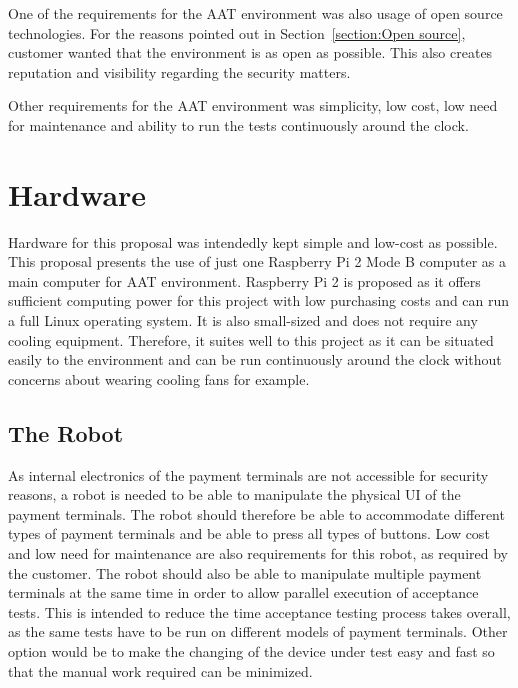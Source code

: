 One of the requirements for the AAT environment was also usage of open source technologies. For the reasons pointed out in Section~\ref{section:Open source}, customer wanted that the environment is as open as possible. This also creates reputation and visibility regarding the security matters.

Other requirements for the AAT environment was simplicity, low cost, low need for maintenance and ability to run the tests continuously around the clock.

\section{Hardware}
\label{section:Proposed hardware}

Hardware for this proposal was intendedly kept simple and low-cost as possible. This proposal presents the use of just one Raspberry Pi 2 Mode B \citep{raspberry} computer as a main computer for AAT environment. Raspberry Pi 2 is proposed as it offers sufficient computing power for this project with low purchasing costs and can run a full Linux operating system. It is also small-sized and does not require any cooling equipment. Therefore, it suites well to this project as it can be situated easily to the environment and can be run continuously around the clock without concerns about wearing cooling fans for example.

\FloatBarrier
\subsection{The Robot}
\label{subsection:The Robot proposal}

As internal electronics of the payment terminals are not accessible for security reasons, a robot is needed to be able to manipulate the physical UI of the payment terminals. The robot should therefore be able to accommodate different types of payment terminals and be able to press all types of buttons. Low cost and low need for maintenance are also requirements for this robot, as required by the customer. The robot should also be able to manipulate multiple payment terminals at the same time in order to allow parallel execution of acceptance tests. This is intended to reduce the time acceptance testing process takes overall, as the same tests have to be run on different models of payment terminals. Other option would be to make the changing of the device under test easy and fast so that the manual work required can be minimized.

